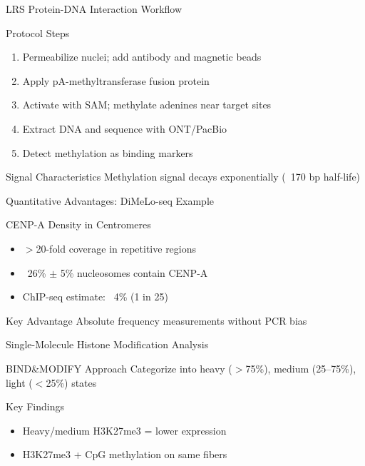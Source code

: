 \documentclass[aspectratio=169]{beamer}
\begin{document}
\begin{frame}{LRS Protein-DNA Interaction Workflow}
  \begin{block}{Protocol Steps}
    \begin{enumerate}
      \item Permeabilize nuclei; add antibody and magnetic beads
      \item Apply pA-methyltransferase fusion protein
      \item Activate with SAM; methylate adenines near target sites
      \item Extract DNA and sequence with ONT/PacBio
      \item Detect methylation as binding markers
    \end{enumerate}
  \end{block}

  \begin{block}{Signal Characteristics}
    Methylation signal decays exponentially (~170 bp half-life)
  \end{block}
\end{frame}

\begin{frame}{Quantitative Advantages: DiMeLo-seq Example}
  \begin{block}{CENP-A Density in Centromeres}
    \begin{itemize}
      \item $>$20-fold coverage in repetitive regions
      \item ~26\% $\pm$ 5\% nucleosomes contain CENP-A
      \item ChIP-seq estimate: ~4\% (1 in 25)
    \end{itemize}
  \end{block}

  \vspace{0.3cm}

  \begin{alertblock}{Key Advantage}
    Absolute frequency measurements without PCR bias
  \end{alertblock}
\end{frame}

\begin{frame}{Single-Molecule Histone Modification Analysis}
  \begin{block}{BIND\&MODIFY Approach}
    Categorize into heavy ($>$75\%), medium (25--75\%), light ($<$25\%) states
  \end{block}

  \begin{block}{Key Findings}
    \begin{itemize}
      \item Heavy/medium H3K27me3 = lower expression
      \item H3K27me3 + CpG methylation on same fibers
    \end{itemize}
  \end{block}
\end{frame}
\end{document}
